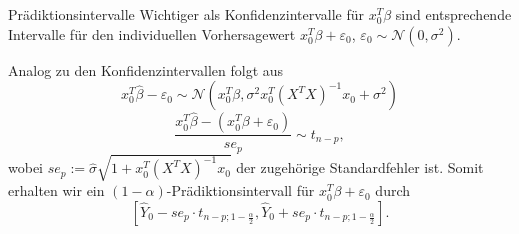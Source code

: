 \begin{karte}{Prädiktionsintervalle}
Wichtiger als Konfidenzintervalle für \(x_0^T \beta\) sind entsprechende Intervalle für den 
individuellen Vorhersagewert \(x_0^T \beta + \varepsilon_0\), \(\varepsilon_0 \sim \mathcal{N}(0, \sigma^2)\).

Analog zu den Konfidenzintervallen folgt aus 
\[ x_0^T \hat{\beta} - \varepsilon_0 \sim \mathcal{N}(x_0^T \beta, \sigma^2 x_0^T (X^T X)^{-1} x_0 + \sigma^2) \]
\[ \frac{x_0^T \hat{\beta} - (x_0^T \beta + \varepsilon_0)}{se_p} \sim t_{n-p}, \]
wobei \(se_p := \hat{\sigma} \sqrt{1+x_0^T (X^T X)^{-1} x_0}\) 
der zugehörige Standardfehler ist. 
Somit erhalten wir ein \((1-\alpha)\)-Prädiktionsintervall für \(x_0^T \beta + \varepsilon_0\) durch 
\[ \left[ \hat{Y}_0 - se_p \cdot t_{n-p;1-\frac{\alpha}{2}}, \hat{Y}_0 + se_p \cdot t_{n-p;1-\frac{\alpha}{2}} \right]. \]
\end{karte}